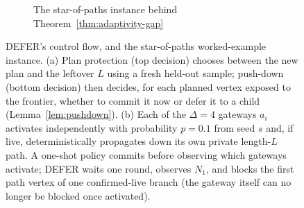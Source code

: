 \documentclass[11pt]{article}
\theoremstyle{definition}
\theoremstyle{remark}
\begin{document}
\begin{figure}[h]
\begin{subfigure}[t]{0.64\textwidth}
{}
\caption{The star-of-paths instance behind Theorem~\ref{thm:adaptivity-gap}}
\label{fig:star-of-paths}
\end{subfigure}

\caption{DEFER's control flow, and the star-of-paths worked-example instance. (a) Plan protection (top decision) chooses between the new plan and the
leftover $L$ using a fresh held-out sample; push-down (bottom decision)
then decides, for each planned vertex exposed to the frontier, whether to
commit it now or defer it to a child (Lemma~\ref{lem:pushdown}). (b) Each
of the $\Delta=4$ gateways $a_i$ activates independently with probability
$p=0.1$ from seed $s$ and, if live, deterministically propagates down its
own private length-$L$ path. A one-shot policy commits before observing
which gateways activate; DEFER waits one round, observes $N_1$, and
blocks the first path vertex of one confirmed-live branch (the gateway
itself can no longer be blocked once activated).}
\end{figure}
\end{document}
